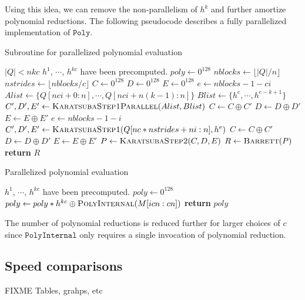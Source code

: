 \documentclass[hctr.tex]{subfiles}
\begin{document}
Using this idea, we can remove the non-parallelism of $h^k$ and further amortize polynomial reductions. The following pseudocode describes a fully parallelized implementation of $\texttt{Poly}$.
\begin{algorithm}[H]
\caption{Subroutine for parallelized polynomial evaluation}\label{polyalgsub}
\begin{algorithmic}[1]
	\Require $|Q| < nkc$
	\Require $h^1$, $\cdots$, $h^{kc}$ have been precomputed.
		\State $poly \gets 0^{128}$
		\State $nblocks \gets \lfloor |Q|/n \rfloor$
		\State $nstrides \gets \lfloor nblocks/c \rfloor$
		\State $C \gets 0^{128}$
		\State $D \gets 0^{128}$
		\State $E \gets 0^{128}$
			\State $e \gets nblocks - 1 - ci$
			\State $Alist \gets \{Q[nci + 0 : n], \cdots, Q[nci + n(k - 1) : n]\}$
			\State $Blist \gets \{h^{e}, \cdots, h^{e - k + 1}\}$
			\State $C', D', E' \gets \Call{KaratsubaStep1Parallel}{Alist, Blist}$
			\State $C \gets C \oplus C'$
			\State $D \gets D \oplus D'$
			\State $E \gets E \oplus E'$
		\EndFor
			\State $e \gets nblocks - 1 - i$
			\State $C', D', E' \gets \Call{KaratsubaStep1}{Q[nc*nstrides + ni : n], h^{e}}$
			\State $C \gets C \oplus C'$
			\State $D \gets D \oplus D'$
			\State $E \gets E \oplus E'$
		\EndFor
		\State $P \gets \Call{KaratsubaStep2}{C, D, E}$
		\State $R \gets \Call{Barrett}{P}$
		\State \textbf{return} $R$
	\EndProcedure
\end{algorithmic}
\end{algorithm}

\begin{algorithm}[H]
\caption{Parallelized polynomial evaluation}\label{polyalg}
\begin{algorithmic}[1]
	\Require $h^1$, $\cdots$, $h^{kc}$ have been precomputed.
		\State $poly \gets 0^{128}$
			\State $poly \gets poly*h^{kc} \oplus \Call{PolyInternal}{M[icn : cn]}$
		\EndFor
		\State \textbf{return} $poly$
	\EndProcedure
\end{algorithmic}
\end{algorithm}
The number of polynomial reductions is reduced further for larger choices of $c$ since $\texttt{PolyInternal}$ only requires a single invocation of polynomial reduction.

\subsection{Speed comparisons}
{\color{red} FIXME Tables, grahps, etc}
\end{document}
